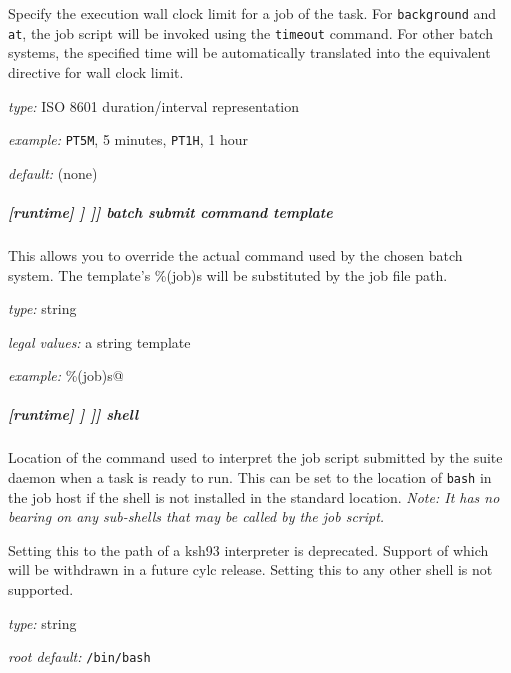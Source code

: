 Specify the execution wall clock limit for a job of the task.
For \lstinline=background= and \lstinline=at=, the job script will be invoked using the \lstinline=timeout= command.
For other batch systems, the specified time will be automatically translated into the equivalent directive for wall clock limit.

\begin{myitemize}
    \item {\em type:} ISO 8601 duration/interval representation
    \item {\em example:} \lstinline=PT5M=, 5 minutes, \lstinline=PT1H=, 1 hour
    \item {\em default:} (none)
\end{myitemize}

\subparagraph[batch submit command template]{[runtime] \textrightarrow [[\_\_NAME\_\_]] \textrightarrow [[[job]]] \textrightarrow batch submit command template}

This allows you to override the actual command used by the chosen batch
system. The template's \%(job)s will be substituted by the
job file path.

\begin{myitemize}
\item {\em type:} string
\item {\em legal values:} a string template
\item {\em example:} \lstinline@llsubmit \%(job)s@
\end{myitemize}

\subparagraph[shell]{[runtime] \textrightarrow [[\_\_NAME\_\_]] \textrightarrow [[[job]]] \textrightarrow shell}
\label{JobSubShell}

Location of the command used to interpret the job script submitted by the
suite daemon when a task is ready to run. This can be set to the location of
\lstinline=bash= in the job host if the shell is not installed in the standard
location.
{\em Note: It has no bearing on any sub-shells that may be called by the job script.}

Setting this to the path of a ksh93 interpreter is deprecated. Support of which
will be withdrawn in a future cylc release. Setting this to any other shell is
not supported.

\begin{myitemize}
\item {\em type:} string
\item {\em root default:} \lstinline=/bin/bash=
\end{myitemize}

